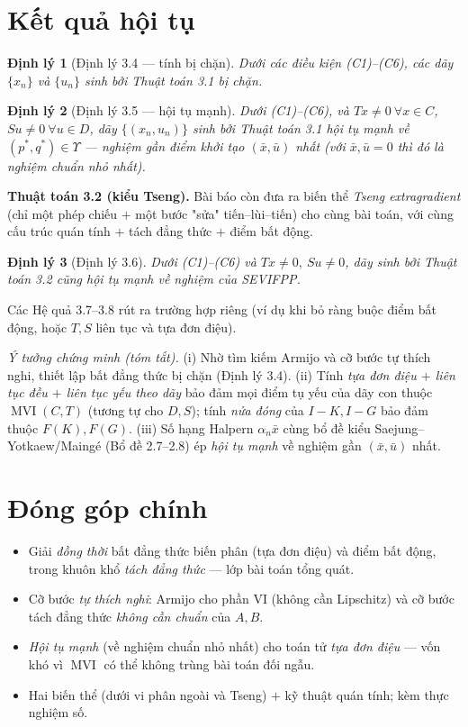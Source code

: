 \documentclass[11pt,a4paper]{article}
\theoremstyle{plain}
\newtheorem{theorem}{Định lý}
\theoremstyle{definition}
\newcommand{\Fix}{F}
\DeclareMathOperator{\MVI}{MVI}
\begin{document}
\section{Kết quả hội tụ}

\begin{theorem}[Định lý 3.4 --- tính bị chặn]
Dưới các điều kiện (C1)--(C6), các dãy $\{x_n\}$ và $\{u_n\}$ sinh bởi Thuật toán 3.1 bị chặn.
\end{theorem}

\begin{theorem}[Định lý 3.5 --- hội tụ mạnh]
Dưới (C1)--(C6), và $Tx\ne 0\ \forall x\in C$, $Su\ne 0\ \forall u\in D$, dãy $\{(x_n,u_n)\}$ sinh bởi Thuật toán 3.1 hội tụ \emph{mạnh} về $(p^{*},q^{*})\in\Upsilon$ --- nghiệm gần điểm khởi tạo $(\bar{x},\bar{u})$ nhất (với $\bar{x},\bar{u}=0$ thì đó là nghiệm \emph{chuẩn nhỏ nhất}).
\end{theorem}

\noindent\textbf{Thuật toán 3.2 (kiểu Tseng).} Bài báo còn đưa ra biến thể \emph{Tseng extragradient} (chỉ một phép chiếu $+$ một bước "sửa" tiến--lùi--tiến) cho cùng bài toán, với cùng cấu trúc quán tính $+$ tách đẳng thức $+$ điểm bất động.
\begin{theorem}[Định lý 3.6]
Dưới (C1)--(C6) và $Tx\ne0,\ Su\ne0$, dãy sinh bởi Thuật toán 3.2 cũng hội tụ \emph{mạnh} về nghiệm của SEVIFPP.
\end{theorem}
\noindent Các Hệ quả 3.7--3.8 rút ra trường hợp riêng (ví dụ khi bỏ ràng buộc điểm bất động, hoặc $T,S$ liên tục và tựa đơn điệu).

\medskip
\noindent\emph{Ý tưởng chứng minh (tóm tắt).} (i) Nhờ tìm kiếm Armijo và cỡ bước tự thích nghi, thiết lập bất đẳng thức bị chặn (Định lý 3.4). (ii) Tính \emph{tựa đơn điệu $+$ liên tục đều $+$ liên tục yếu theo dãy} bảo đảm mọi điểm tụ yếu của dãy con thuộc $\MVI(C,T)$ (tương tự cho $D,S$); tính \emph{nửa đóng} của $I-K,I-G$ bảo đảm thuộc $\Fix(K),\Fix(G)$. (iii) Số hạng Halpern $\alpha_n\bar{x}$ cùng bổ đề kiểu Saejung--Yotkaew/Maingé (Bổ đề 2.7--2.8) ép \emph{hội tụ mạnh} về nghiệm gần $(\bar{x},\bar{u})$ nhất.

\section{Đóng góp chính}
\begin{itemize}[leftmargin=1.4em,itemsep=1pt]
\item Giải \emph{đồng thời} bất đẳng thức biến phân (tựa đơn điệu) và điểm bất động, trong khuôn khổ \emph{tách đẳng thức} --- lớp bài toán tổng quát.
\item Cỡ bước \emph{tự thích nghi}: Armijo cho phần VI (không cần Lipschitz) và cỡ bước tách đẳng thức \emph{không cần chuẩn} của $A,B$.
\item \emph{Hội tụ mạnh} (về nghiệm chuẩn nhỏ nhất) cho toán tử \emph{tựa đơn điệu} --- vốn khó vì $\MVI$ có thể không trùng bài toán đối ngẫu.
\item Hai biến thể (dưới vi phân ngoài và Tseng) $+$ kỹ thuật quán tính; kèm thực nghiệm số.
\end{itemize}
\end{document}

